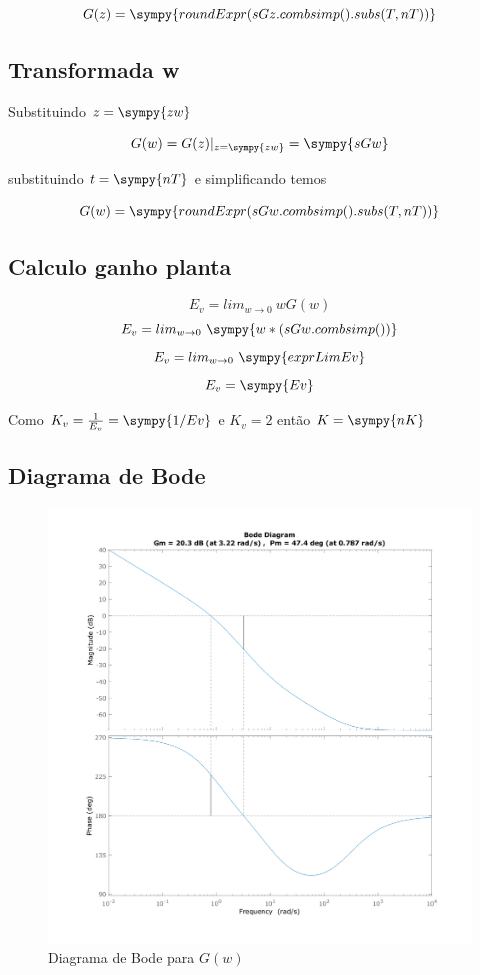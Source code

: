 \documentclass[a4paper,11pt]{article}
\begin{document}
\begin{equation}
    G(z) = \sympy{roundExpr(sGz.combsimp().subs(T,nT))}
\end{equation}

\subsection{Transformada w}

Substituindo $z = \sympy{zw}$

$$
G(w) = G(z)|_{z=\sympy{zw}} = \sympy{sGw}
$$

substituindo $t = \sympy{nT}$ e simplificando temos

\begin{equation}
    G(w) = \sympy{roundExpr(sGw.combsimp().subs(T,nT))}
\end{equation}

\subsection{Calculo ganho planta}

$$E_v = lim_{w \rightarrow 0}\ w G(w)$$
$$E_v = lim_{w \rightarrow 0}\  \sympy{w*(sGw.combsimp())}$$
$$E_v = lim_{w \rightarrow 0}\  \sympy{exprLimEv}$$
$$E_v = \sympy{Ev}$$

Como $K_v = \frac{1}{E_v} = \sympy{1/Ev}$  e $K_v = 2$ então $K = \sympy{nK}$

\subsection{Diagrama de Bode}

\begin{figure}[H]
    \centering
    \includegraphics[width=0.9\linewidth]{img/exsim4-bodeplot-gw.png}
    \caption{Diagrama de Bode para $G(w)$}
\end{figure}
\end{document}
